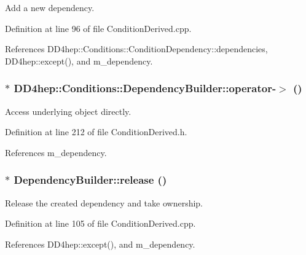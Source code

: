 Add a new dependency. 

Definition at line 96 of file ConditionDerived.cpp.

References DD4hep::Conditions::ConditionDependency::dependencies, DD4hep::except(), and m\_\-dependency.\hypertarget{class_d_d4hep_1_1_conditions_1_1_dependency_builder_a250f7140327ba7e4e7344b47313ad0b5}{
\subsubsection[{operator-\/$>$}]{$\ast$ DD4hep::Conditions::DependencyBuilder::operator-\/$>$ ()}}
\label{class_d_d4hep_1_1_conditions_1_1_dependency_builder_a250f7140327ba7e4e7344b47313ad0b5}


Access underlying object directly. 

Definition at line 212 of file ConditionDerived.h.

References m\_\-dependency.\hypertarget{class_d_d4hep_1_1_conditions_1_1_dependency_builder_a184c80416875c91985dda61b26a04022}{
\subsubsection[{release}]{ $\ast$ DependencyBuilder::release ()}}
\label{class_d_d4hep_1_1_conditions_1_1_dependency_builder_a184c80416875c91985dda61b26a04022}


Release the created dependency and take ownership. 

Definition at line 105 of file ConditionDerived.cpp.

References DD4hep::except(), and m\_\-dependency.

